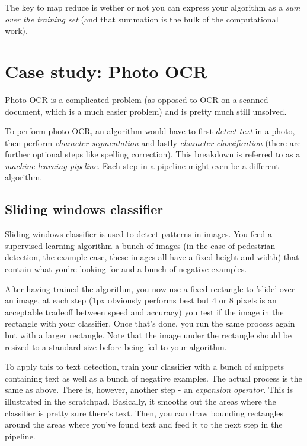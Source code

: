 The key to map reduce is wether or not you can express your algorithm as a \emph{sum over the training set} (and that summation is the bulk of the computational work).

\chapter{Case study: Photo OCR}

Photo OCR is a complicated problem (as opposed to OCR on a scanned document, which is a much easier problem) and is pretty much still unsolved.

To perform photo OCR, an algorithm would have to first \emph{detect text} in a photo, then perform \emph{character segmentation} and lastly \emph{character classification} (there are further optional steps like spelling correction). This breakdown is referred to as a \emph{machine learning pipeline}. Each step in a pipeline might even be a different algorithm.

\section{Sliding windows classifier}

Sliding windows classifier is used to detect patterns in images. You feed a supervised learning algorithm a bunch of images (in the case of pedestrian detection, the example case, these images all have a fixed height and width) that contain what you're looking for and a bunch of negative examples.

After having trained the algorithm, you now use a fixed rectangle to 'slide' over an image, at each step (1px obviously performs best but 4 or 8 pixels is an acceptable tradeoff between speed and accuracy) you test if the image in the rectangle with your classifier. Once that's done, you run the same process again but with a larger rectangle. Note that the image under the rectangle should be resized to a standard size before being fed to your algorithm.

To apply this to text detection, train your classifier with a bunch of snippets containing text as well as a bunch of negative examples. The actual process is the same as above. There is, however, another step - an \emph{expansion operator}. This is illustrated in the scratchpad. Basically, it smooths out the areas where the classifier is pretty sure there's text. Then, you can draw bounding rectangles around the areas where you've found text and feed it to the next step in the pipeline.

